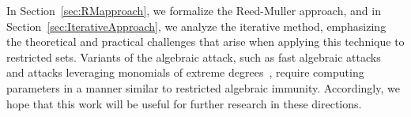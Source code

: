 \documentclass[11pt]{llncs}
\begin{document}

In Section~\ref{sec:RMapproach}, we formalize the Reed-Muller approach, and in Section~\ref{sec:IterativeApproach}, we analyze the iterative method, emphasizing the theoretical and practical challenges that arise when applying this technique to restricted sets. 
Variants of the algebraic attack, such as fast algebraic attacks~\cite{C:Courtois03,FSE:Armknecht04} and attacks leveraging monomials of extreme degrees~\cite{eprint:MeaWan24}, require computing parameters in a manner similar to restricted algebraic immunity. 
Accordingly, we hope that this work will be useful for further research in these directions.





\end{document}
